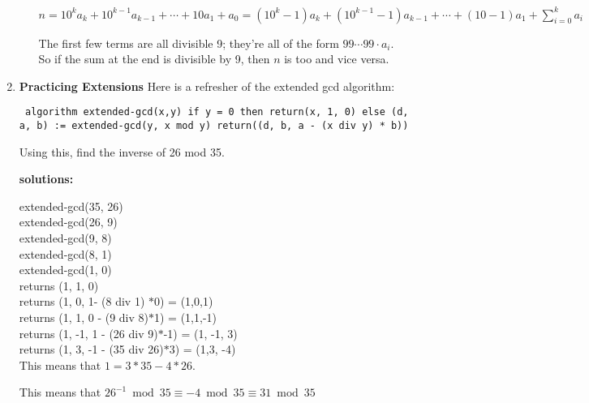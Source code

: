 \documentclass[11pt]{article}
\newif\ifsolutions
\begin{document}
\begin{enumerate}
\begin{enumerate}
       $n = 10^k a_k + 10^{k-1}a_{k-1} + \cdots + 10a_1 + a_0 = (10^k-1) a_k + (10^{k-1}-1)a_{k-1} + \cdots + (10-1)a_1 + \sum_{i=0}^k a_i$

       The first few terms are all divisible 9; they're all of the form $99\cdots 99 \cdot a_i$.
       So if the sum at the end is divisible by 9, then $n$ is too and vice versa. 
\end{enumerate}
\fi


\item {\bf Practicing Extensions} Here is a refresher of the extended gcd algorithm:

{\obeylines \tt
algorithm extended-gcd(x,y)
\quad if y = 0 then return(x, 1, 0)
\quad else
\quad\quad (d, a, b) := extended-gcd(y, x mod y)
\quad\quad return((d, b, a - (x div y) * b))}

Using this, find the inverse of 26 mod 35.

\ifsolutions
 {\bf solutions:} 

extended-gcd(35, 26) \\
\tab extended-gcd(26, 9) \\
\tab \tab extended-gcd(9, 8) \\
\tab \tab \tab extended-gcd(8, 1) \\
\tab \tab \tab \tab extended-gcd(1, 0) \\
\tab \tab\tab \tab returns (1, 1, 0) \\
\tab \tab \tab returns (1, 0, 1- (8 div 1) $*$0) = (1,0,1)  \\
\tab \tab returns (1, 1, 0 - (9 div 8)$*$1) = (1,1,-1) \\
\tab returns (1, -1, 1 - (26 div 9)$*$-1) = (1, -1, 3) \\
returns (1, 3, -1 - (35 div 26)$*$3) = (1,3, -4) \\

This means that $1 = 3*35 -4*26$.

This means that $26^{-1} \bmod{35} \equiv -4 \bmod{35} \equiv 31 \bmod{35}$



\end{enumerate}
\end{document}
